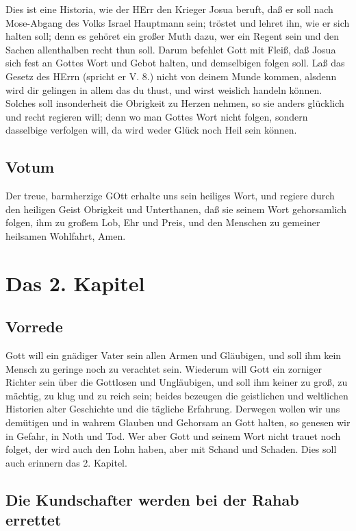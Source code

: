 Dies ist eine Historia, wie der HErr den Krieger Josua beruft, daß er soll nach Mose-Abgang des Volks Israel Hauptmann sein; tröstet und lehret ihn, wie er sich halten soll; denn es gehöret ein großer Muth dazu, wer ein Regent sein und den Sachen allenthalben recht thun soll. Darum befehlet Gott mit Fleiß, daß Josua sich fest an Gottes Wort und Gebot halten, und demselbigen folgen soll. Laß das Gesetz des HErrn (spricht er V. 8.) nicht von deinem Munde kommen, alsdenn wird dir gelingen in allem das du thust, und wirst weislich handeln können. Solches soll insonderheit die Obrigkeit zu Herzen nehmen, so sie anders glücklich und recht regieren will; denn wo man Gottes Wort nicht folgen, sondern dasselbige verfolgen will, da wird weder Glück noch Heil sein können.

\section{Votum}

Der treue, barmherzige GOtt erhalte uns sein heiliges Wort, und regiere durch den heiligen Geist Obrigkeit und Unterthanen, daß sie seinem Wort gehorsamlich folgen, ihm zu großem Lob, Ehr und Preis, und den Menschen zu gemeiner heilsamen Wohlfahrt, Amen.

\chapter{Das 2. Kapitel}

\section{Vorrede}

Gott will ein gnädiger Vater sein allen Armen und Gläubigen, und soll ihm kein Mensch zu geringe noch zu verachtet sein. Wiederum will Gott ein zorniger Richter sein über die Gottlosen und Ungläubigen, und soll ihm keiner zu groß, zu mächtig, zu klug und zu reich sein; beides bezeugen die geistlichen und weltlichen Historien alter Geschichte und die tägliche Erfahrung. Derwegen wollen wir uns demütigen und in wahrem Glauben und Gehorsam an Gott halten, so genesen wir in Gefahr, in Noth und Tod. Wer aber Gott und seinem Wort nicht trauet noch folget, der wird auch den Lohn haben, aber mit Schand und Schaden. Dies soll auch erinnern das 2. Kapitel.

\section{Die Kundschafter werden bei der Rahab errettet}
